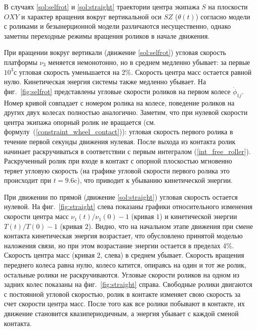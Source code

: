 В случаях \ref{sol:selfrot} и \ref{sol:straight} траектории центра экипажа $S$ на плоскости $OXY$ и характер вращения вокруг вертикальной оси $SZ$ ($\theta(t)$) согласно модели с роликами и безынерционной модели различаются несущественно, однако заметны переходные режимы вращения роликов в начале движения.

При вращении вокруг вертикали (движение \ref{sol:selfrot}) угловая скорость платформы $\nu_3$ меняется немонотонно, но в среднем медленно убывает: за первые $10^3$с угловая скорость уменьшается на 2\%. Скорость центра масс остается равной нулю. Кинетическая энергия системы также медленно убывает. На 
фиг.~\ref{fig:selfrot} представлены угловые скорости роликов на первом колесе $\dot{\phi}_{1j}$. Номер кривой совпадает с номером ролика на колесе, поведение роликов на других двух колесах полностью аналогично. Заметим, что при нулевой скорости центра экипажа опорный ролик не вращается (см. формулу~(\ref{constraint_wheel_contact})): угловая скорость первого ролика в течение первой секунды движения нулевая. После выхода из контакта ролик начинает раскручиваться в соответствии с первым интегралом (\ref{int_free_roller}). Раскрученный ролик при входе в контакт с опорной плоскостью мгновенно теряет угловую скорость (на графике угловой скорости первого ролика это происходит при $t=9.6$c), что приводит к убыванию кинетической энергии.

При движении по прямой (движение \ref{sol:straight}) угловая скорость остается нулевой.
На фиг.~\ref{fig:straight} слева показаны графики относительного изменения скорости центра масс $\nu_1(t)/\nu_1(0)-1$ (кривая $\textit{1}$) и кинетической энергии $T(t)/T(0)-1$ (кривая $\textit{2}$). Видно, что на начальном этапе движения при смене контакта кинетическая энергия возрастает, что обусловлено принятой моделью наложения связи, но при этом возрастание энергии остается в пределах 4\%. Скорость центра масс (кривая $\textit{2}$, слева) в среднем убывает. Скорость вращения переднего колеса равна нулю, колесо катится, опираясь на один и тот же ролик, остальные ролики не раскручиваются. Угловые скорости роликов на одном из задних колес показаны на фиг.~\ref{fig:straight} справа. Свободные ролики двигаются с постоянной угловой скоростью, ролик в контакте изменяет свою скорость за счет скорости центра масс. После того как все ролики побывают в контакте, их движение становится квазипериодичным, а энергия убывает с каждой сменой контакта. 

